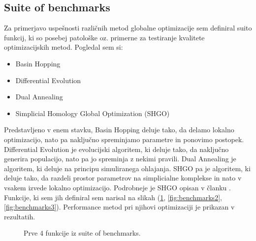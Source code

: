 \documentclass[a4paper]{article}
\begin{document}
\subsection{Suite of benchmarks}
Za primerjavo uspešnosti različnih metod globalne optimizacije sem definiral suito funkcij, ki so posebej
patološke oz. primerne za testiranje kvalitete optimizacijskih metod. Pogledal sem si:
\begin{itemize}
    \item Basin Hopping
    \item Differential Evolution
    \item Dual Annealing
    \item Simplicial Homology Global Optimization (SHGO)
\end{itemize}

Predstavljeno v enem stavku, Basin Hopping deluje tako, da delamo lokalno optimizacijo, nato pa naključno 
spreminjamo parametre in ponovimo postopek. Differential Evolution je evolucijski algoritem, ki deluje tako,
da naključno generira populacijo, nato pa jo spreminja z nekimi pravili. Dual Annealing je algoritem, ki
deluje na principu simuliranega ohlajanja. SHGO pa je algoritem, ki deluje tako, da razdeli prostor parametrov
na simplicialne komplekse in nato v vsakem izvede lokalno optimizacijo. Podrobneje je SHGO opisan v članku
\cite{Endres2018}. \\

Funkcije, ki sem jih definiral sem 
narisal na slikah (\ref{fig:benchmarks}, \ref{fig:benchmarks2}, \ref{fig:benchmarks3}). Performance metod
pri njihovi optimizaciji je prikazan v rezultatih.\\

\begin{figure}[H]
    \centering
    \caption{Prve 4 funkcije iz suite of benchmarks.}
    \label{fig:benchmarks}
\end{figure}
\end{document}
